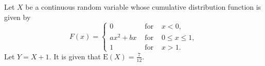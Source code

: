 \documentclass[letterpaper,10pt,addpoints]{exam}
\begin{document}


\newpage
\begin{questions}
\question[40]
Let $X$ be a continuous random variable whose cumulative distribution function is given by
$$
F(x)=\left\{\begin{array}{lll}
0 & \text { for } & x<0, \\
a x^2+b x & \text { for } & 0 \leq x \leq 1, \\
1 & \text { for } & x>1 .
\end{array}\right.
$$
Let $Y = X+1$. It is given that $\mathrm{E}(X)=\frac{7}{12}$.
\end{questions}
\end{document}
